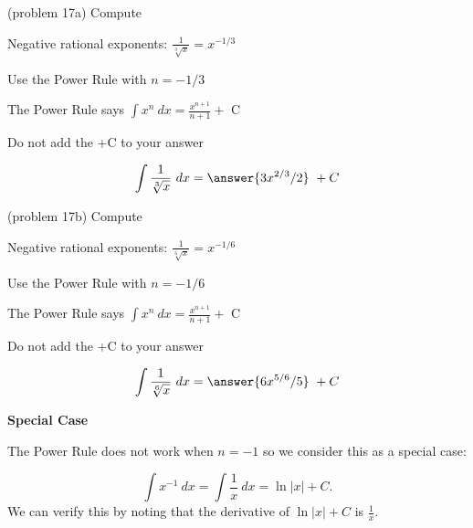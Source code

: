 \documentclass[handout]{ximera}
\begin{document}
\begin{problem}(problem 17a)
Compute 

\begin{hint}
Negative rational exponents: $\frac{1}{\sqrt[3]x} = x^{-1/3}$
\end{hint}
\begin{hint}
Use the Power Rule with $n=-1/3$
\end{hint}
\begin{hint}
The Power Rule says $\int x^n \ dx = \frac{x^{n+1}}{n+1} +$ C
\end{hint}
\begin{hint}
\begin{center}
Do not add the +C to your answer
\end{center}
\end{hint}

\[
\int \frac{1}{\sqrt[3]x} \ dx =
\answer{3x^{2/3} /2} \ + C
\]
\end{problem}



\begin{problem}(problem 17b)
Compute 

\begin{hint}
Negative rational exponents: $\frac{1}{\sqrt[6]x} = x^{-1/6}$
\end{hint}
\begin{hint}
Use the Power Rule with $n=-1/6$
\end{hint}
\begin{hint}
The Power Rule says $\int x^n \ dx = \frac{x^{n+1}}{n+1} +$ C
\end{hint}
\begin{hint}
\begin{center}
Do not add the +C to your answer
\end{center}
\end{hint}

\[
\int \frac{1}{\sqrt[6]x} \ dx =
\answer{6x^{5/6} /5} \ + C
\]
\end{problem}



\begin{center}
\textbf{Special Case}
\end{center}

The Power Rule does not work when $n = -1$ so we consider this as a special case:

\begin{example}[example 18]
\[\int x^{-1} \ dx = \int \frac{1}{x}  \ dx = \ln |x| +C.\]
We can verify this by noting that the derivative of $\ln|x| + C$ is $\displaystyle{\frac{1}{x}}$.
\end{example}
\end{document}
